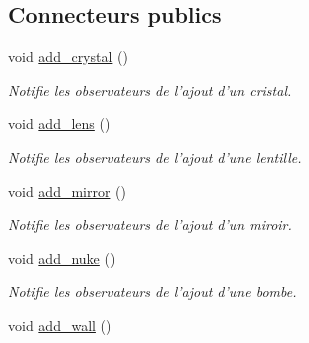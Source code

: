 \subsection*{Connecteurs publics}
\begin{DoxyCompactItemize}
\item 
\hypertarget{classElements_a964576c05a5b9ec733a663474f8fd978}{void \hyperlink{classElements_a964576c05a5b9ec733a663474f8fd978}{add\+\_\+crystal} ()}\label{classElements_a964576c05a5b9ec733a663474f8fd978}

\begin{DoxyCompactList}\small\item\em Notifie les observateurs de l'ajout d'un cristal. \end{DoxyCompactList}\item 
\hypertarget{classElements_a8093eca3330566813da371aecc96530c}{void \hyperlink{classElements_a8093eca3330566813da371aecc96530c}{add\+\_\+lens} ()}\label{classElements_a8093eca3330566813da371aecc96530c}

\begin{DoxyCompactList}\small\item\em Notifie les observateurs de l'ajout d'une lentille. \end{DoxyCompactList}\item 
\hypertarget{classElements_a8d7a4e7ff0c84f105f0f0116425293a7}{void \hyperlink{classElements_a8d7a4e7ff0c84f105f0f0116425293a7}{add\+\_\+mirror} ()}\label{classElements_a8d7a4e7ff0c84f105f0f0116425293a7}

\begin{DoxyCompactList}\small\item\em Notifie les observateurs de l'ajout d'un miroir. \end{DoxyCompactList}\item 
\hypertarget{classElements_aa0884faf781bb26d6ca4dd8751b0eb32}{void \hyperlink{classElements_aa0884faf781bb26d6ca4dd8751b0eb32}{add\+\_\+nuke} ()}\label{classElements_aa0884faf781bb26d6ca4dd8751b0eb32}

\begin{DoxyCompactList}\small\item\em Notifie les observateurs de l'ajout d'une bombe. \end{DoxyCompactList}\item 
\hypertarget{classElements_ad4b05e8a07d9f6867035243c5e3f7572}{void \hyperlink{classElements_ad4b05e8a07d9f6867035243c5e3f7572}{add\+\_\+wall} ()}\label{classElements_ad4b05e8a07d9f6867035243c5e3f7572}


\end{DoxyCompactItemize}
